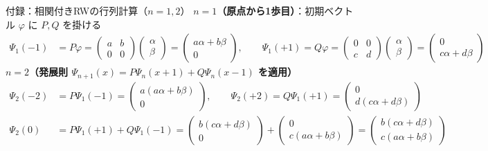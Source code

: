 \documentclass[dvipdfmx,aspectratio=169,10pt]{beamer}
\newcommand{\bodycolor}{\color{ink}}
\begin{document}
\appendix
\begin{frame}[t]{付録：相関付きRWの行列計算（$n=1,2$）}
  \bodycolor
  \small
  {\color{myblue}\bfseries $n=1$（原点から1歩目）}：初期ベクトル $\varphi$ に $P,Q$ を掛ける
  {\footnotesize
  \[\begin{aligned}
    \Psi_1(-1)&=P\varphi=\begin{pmatrix}a&b\\0&0\end{pmatrix}\begin{pmatrix}\alpha\\\beta\end{pmatrix}
      =\begin{pmatrix}a\alpha+b\beta\\0\end{pmatrix},\qquad
    \Psi_1(+1)=Q\varphi=\begin{pmatrix}0&0\\c&d\end{pmatrix}\begin{pmatrix}\alpha\\\beta\end{pmatrix}
      =\begin{pmatrix}0\\c\alpha+d\beta\end{pmatrix}
  \end{aligned}\]}
  {\color{myblue}\bfseries $n=2$（発展則 $\Psi_{n+1}(x){=}P\Psi_n(x{+}1){+}Q\Psi_n(x{-}1)$ を適用）}
  {\footnotesize
  \[\begin{aligned}
    \Psi_2(-2)&=P\Psi_1(-1)=\begin{pmatrix}a(a\alpha+b\beta)\\0\end{pmatrix},\qquad
    \Psi_2(+2)=Q\Psi_1(+1)=\begin{pmatrix}0\\d(c\alpha+d\beta)\end{pmatrix}\\[2pt]
    \Psi_2(0)&=P\Psi_1(+1)+Q\Psi_1(-1)
      =\begin{pmatrix}b(c\alpha+d\beta)\\0\end{pmatrix}+\begin{pmatrix}0\\c(a\alpha+b\beta)\end{pmatrix}
      =\begin{pmatrix}b(c\alpha+d\beta)\\c(a\alpha+b\beta)\end{pmatrix}
  \end{aligned}\]}
\end{frame}
\end{document}
